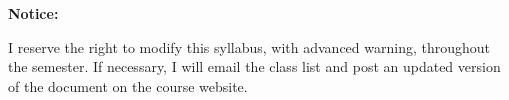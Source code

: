 \documentclass[12pt]{article}
\begin{document}
\bigskip

\textbf{Notice:} \vspace{6pt}

I reserve the right to modify this syllabus, with advanced warning, throughout
the semester. If necessary, I will email the class list and post an updated
version of the document on the course website.











\end{document}
